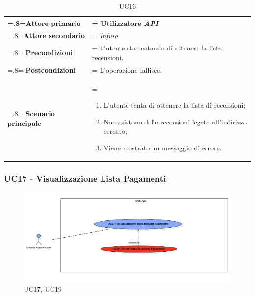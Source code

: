            \begin{table}[H]
                \centering
                \renewcommand{\arraystretch}{1.8}
                \renewcommand\tabularxcolumn[1]{m{#1}}
                \begin{tabularx}{0.9\textwidth} {
                    >{\hsize=.8\hsize\linewidth=\hsize}X
                    >{\hsize=1.2\hsize\linewidth=\hsize}X}
                    \hline
                    \textbf{Attore primario} & Utilizzatore \textit{API} \\
                    \hline
                    \textbf{Attore secondario} & \textit{Infura} \\
                    \hline
                    \textbf{Precondizioni} & L'utente sta tentando di ottenere la lista recensioni. \\
                    \hline
                    \textbf{Postcondizioni} & L'operazione fallisce. \\
                    \hline
                    \textbf{Scenario principale} &
                        \begin{enumerate}
                            \item L'utente tenta di ottenere la lista di recensioni;
                            \item Non esistono delle recensioni legate all'indirizzo cercato;
                            \item Viene mostrato un messaggio di errore.
                        \end{enumerate} \\
                    \hline
                \end{tabularx}
                \caption{UC16}
            \end{table}

        \subsubsection{UC17 - Visualizzazione Lista Pagamenti}
        \label{UC17}

            \begin{figure}[H]
                \centering
                \includegraphics[scale=0.4]{src/img/UC17.png}
                \caption{UC17, UC19}
            \end{figure}

